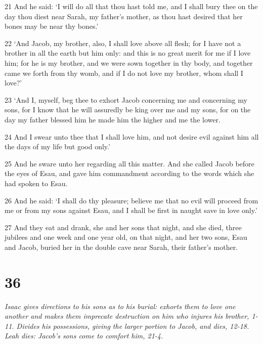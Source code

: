 \par 21 And he said: ‘I will do all that thou hast told me, and I shall bury thee on the day thou diest near Sarah, my father's mother, as thou hast desired that her bones may be near thy bones.’
\par 22 ‘And Jacob, my brother, also, I shall love above all flesh; for I have not a brother in all the earth but him only: and this is no great merit for me if I love him; for he is my brother, and we were sown together in thy body, and together came we forth from thy womb, and if I do not love my brother, whom shall I love?’
\par 23 ‘And I, myself, beg thee to exhort Jacob concerning me and concerning my sons, for I know that he will assuredly be king over me and my sons, for on the day my father blessed him he made him the higher and me the lower.
\par 24 And I swear unto thee that I shall love him, and not desire evil against him all the days of my life but good only.’
\par 25 And he sware unto her regarding all this matter. And she called Jacob before the eyes of Esau, and gave him commandment according to the words which she had spoken to Esau.
\par 26 And he said: ‘I shall do thy pleasure; believe me that no evil will proceed from me or from my sons against Esau, and I shall be first in naught save in love only.’
\par 27 And they eat and drank, she and her sons that night, and she died, three jubilees and one week and one year old, on that night, and her two sons, Esau and Jacob, buried her in the double cave near Sarah, their father's mother.

\chapter{36}

\par \textit{Isaac gives directions to his sons as to his burial: exhorts them to love one another and makes them imprecate destruction on him who injures his brother, 1-11. Divides his possessions, giving the larger portion to Jacob, and dies, 12-18. Leah dies: Jacob's sons come to comfort him, 21-4.}

